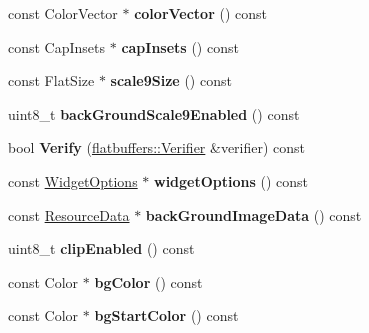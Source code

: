 \begin{DoxyCompactItemize}
const Color\+Vector $\ast$ {\bfseries color\+Vector} () const
\item 
\mbox{\label{structflatbuffers_1_1PanelOptions_a903ba709317e61ffb6161507b4cb2ca2}} 
const Cap\+Insets $\ast$ {\bfseries cap\+Insets} () const
\item 
\mbox{\label{structflatbuffers_1_1PanelOptions_a411343c1d8d9537121b6b49bbe2fddf9}} 
const Flat\+Size $\ast$ {\bfseries scale9\+Size} () const
\item 
\mbox{\label{structflatbuffers_1_1PanelOptions_a50ffdca77b843dccb779935f2e15d9f4}} 
uint8\+\_\+t {\bfseries back\+Ground\+Scale9\+Enabled} () const
\item 
\mbox{\label{structflatbuffers_1_1PanelOptions_a69f32d97e6ed88697177033ef92ebc5a}} 
bool {\bfseries Verify} (\hyperlink{classflatbuffers_1_1Verifier}{flatbuffers\+::\+Verifier} \&verifier) const
\item 
\mbox{\label{structflatbuffers_1_1PanelOptions_a71c36ea1c85f38e98379dcb577650b72}} 
const \hyperlink{structflatbuffers_1_1WidgetOptions}{Widget\+Options} $\ast$ {\bfseries widget\+Options} () const
\item 
\mbox{\label{structflatbuffers_1_1PanelOptions_a4a4c5ae8c9df23607b9c34eafe121857}} 
const \hyperlink{structflatbuffers_1_1ResourceData}{Resource\+Data} $\ast$ {\bfseries back\+Ground\+Image\+Data} () const
\item 
\mbox{\label{structflatbuffers_1_1PanelOptions_a2de039ed6575ed39eabf8f103b36af9e}} 
uint8\+\_\+t {\bfseries clip\+Enabled} () const
\item 
\mbox{\label{structflatbuffers_1_1PanelOptions_af5a0ccc8a7043ebd10ebff41377a58a4}} 
const Color $\ast$ {\bfseries bg\+Color} () const
\item 
\mbox{\label{structflatbuffers_1_1PanelOptions_a187ef7bdd0d3b0aac625a82117071304}} 
const Color $\ast$ {\bfseries bg\+Start\+Color} () const

\end{DoxyCompactItemize}
